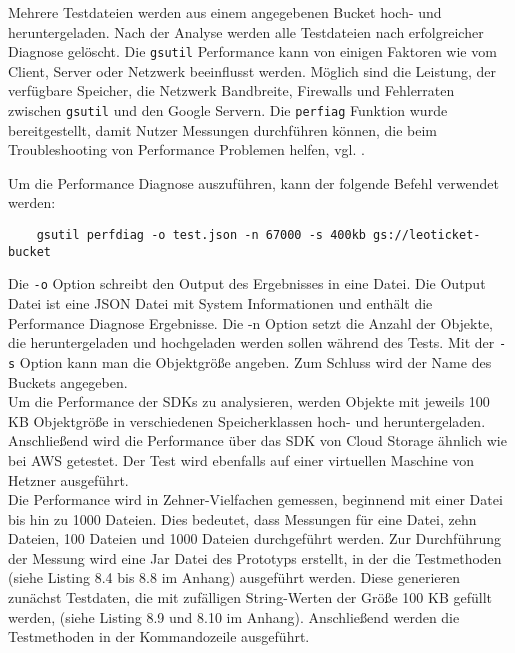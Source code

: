 Mehrere Testdateien werden aus einem angegebenen Bucket hoch- und heruntergeladen. Nach der Analyse werden alle Testdateien nach erfolgreicher Diagnose gelöscht. Die \verb|gsutil| Performance kann von einigen Faktoren wie vom Client, Server oder Netzwerk beeinflusst werden. Möglich sind die Leistung, der verfügbare Speicher, die Netzwerk Bandbreite, Firewalls und Fehlerraten zwischen \verb|gsutil| und den Google Servern. Die \verb|perfiag| Funktion wurde bereitgestellt, damit Nutzer Messungen durchführen können, die beim Troubleshooting von Performance Problemen helfen, vgl. \cite{gc-perfdiag}.

\newpage

Um die Performance Diagnose auszuführen, kann der folgende Befehl verwendet werden:

\begin{lstlisting}
	gsutil perfdiag -o test.json -n 67000 -s 400kb gs://leoticket-bucket
\end{lstlisting}

Die \verb|-o| Option schreibt den Output des Ergebnisses in eine Datei. Die Output Datei ist eine JSON Datei mit System Informationen und enthält die Performance Diagnose Ergebnisse. Die -n Option setzt die Anzahl der Objekte, die heruntergeladen und hochgeladen werden sollen während des Tests. Mit der \verb|-s| Option kann man die Objektgröße angeben. Zum Schluss wird der Name des Buckets angegeben.\\

Um die Performance der SDKs zu analysieren, werden Objekte mit jeweils 100 KB Objektgröße in verschiedenen Speicherklassen hoch- und heruntergeladen. Anschließend wird die Performance über das SDK von Cloud Storage ähnlich wie bei AWS getestet. Der Test wird ebenfalls auf einer virtuellen Maschine von Hetzner ausgeführt.\\

Die Performance wird in Zehner-Vielfachen gemessen, beginnend mit einer Datei bis hin zu 1000 Dateien. Dies bedeutet, dass Messungen für eine Datei, zehn Dateien, 100 Dateien und 1000 Dateien durchgeführt werden. Zur Durchführung der Messung wird eine Jar Datei des Prototyps erstellt, in der die Testmethoden (siehe Listing 8.4 bis 8.8 im Anhang) ausgeführt werden. Diese generieren zunächst Testdaten, die mit zufälligen String-Werten der Größe 100 KB gefüllt werden, (siehe Listing 8.9 und 8.10 im Anhang). Anschließend werden die Testmethoden in der Kommandozeile ausgeführt. 

\newpage

